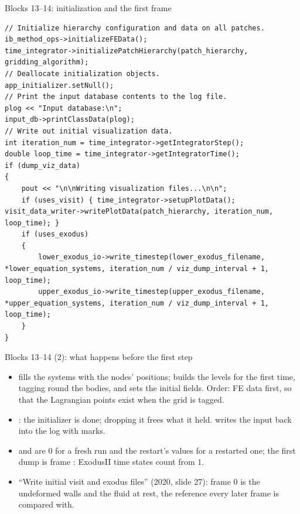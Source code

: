 \documentclass[aspectratio=169,11pt]{beamer}
\begin{document}
\begin{frame}[fragile]{Blocks 13--14: initialization and the first frame}
\label{fr:init}
\begin{lstlisting}[style=cpptiny]
// Initialize hierarchy configuration and data on all patches.
ib_method_ops->initializeFEData();
time_integrator->initializePatchHierarchy(patch_hierarchy, gridding_algorithm);
// Deallocate initialization objects.
app_initializer.setNull();
// Print the input database contents to the log file.
plog << "Input database:\n";
input_db->printClassData(plog);
// Write out initial visualization data.
int iteration_num = time_integrator->getIntegratorStep();
double loop_time = time_integrator->getIntegratorTime();
if (dump_viz_data)
{
    pout << "\n\nWriting visualization files...\n\n";
    if (uses_visit) { time_integrator->setupPlotData(); visit_data_writer->writePlotData(patch_hierarchy, iteration_num, loop_time); }
    if (uses_exodus)
    {
        lower_exodus_io->write_timestep(lower_exodus_filename, *lower_equation_systems, iteration_num / viz_dump_interval + 1, loop_time);
        upper_exodus_io->write_timestep(upper_exodus_filename, *upper_equation_systems, iteration_num / viz_dump_interval + 1, loop_time);
    }
}
\end{lstlisting}
\end{frame}

\begin{frame}{Blocks 13--14 (2): what happens before the first step}
\label{fr:writers2}
\footnotesize
\begin{itemize}
  \item {} fills the systems with the nodes' positions;  builds the levels for the first time, tagging round the bodies, and sets the initial fields. Order: FE data first, so that the Lagrangian points exist when the grid is tagged.
  \item {}: the initializer is done; dropping it frees what it held.  writes the input back into the log with  marks.
  \item {} and  are $0$ for a fresh run and the restart's values for a restarted one; the first dump is frame : ExodusII time states count from $1$.
  \item ``Write initial visit and exodus files'' (2020, slide 27): frame $0$ is the undeformed walls and the fluid at rest, the reference every later frame is compared with.
\end{itemize}
\end{frame}
\end{document}
